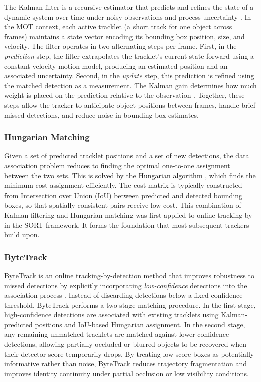 The Kalman filter is a recursive estimator that predicts and refines the 
state of a dynamic system over time under noisy observations and process 
uncertainty \citep{Kalman1960}. In the MOT context, each active tracklet (a short track for one object across frames)
maintains a state vector encoding its bounding box position, size, and 
velocity. The filter operates in two alternating steps per frame. First, 
in the \emph{prediction} step, the filter extrapolates the tracklet's 
current state forward using a constant-velocity motion model, producing an 
estimated position and an associated uncertainty. Second, in the 
\emph{update} step, this prediction is refined using the matched detection 
as a measurement. The Kalman gain determines how much weight is placed on
the prediction relative to the observation \citep{WelchBishop2006}. 
Together, these steps allow the tracker to anticipate object positions 
between frames, handle brief missed detections, and reduce noise in 
bounding box estimates.

\subsubsection*{Hungarian Matching}

Given a set of predicted tracklet positions and a set of new detections, 
the data association problem reduces to finding the optimal one-to-one 
assignment between the two sets. This is solved by the Hungarian algorithm 
\citep{Kuhn1955, Munkres1957}, which finds the minimum-cost assignment 
efficiently. The cost matrix is typically constructed from Intersection 
over Union (IoU) between predicted and detected bounding boxes, so that 
spatially consistent pairs receive low cost. This combination of Kalman 
filtering and Hungarian matching was first applied to online tracking by 
\citet{Bewley2016} in the SORT framework. It forms the foundation that most subsequent trackers build upon.

\subsubsection*{ByteTrack}

ByteTrack is an online tracking-by-detection method that improves robustness 
to missed detections by explicitly incorporating \emph{low-confidence} 
detections into the association process \citep{Zhang2021ByteTrack}. Instead 
of discarding detections below a fixed confidence threshold, ByteTrack 
performs a two-stage matching procedure. In the first stage, high-confidence 
detections are associated with existing tracklets using Kalman-predicted 
positions and IoU-based Hungarian assignment. In the second stage, any 
remaining unmatched tracklets are matched against lower-confidence detections, 
allowing partially occluded or blurred objects to be recovered when their 
detector score temporarily drops. By treating low-score boxes as potentially 
informative rather than noise, ByteTrack reduces trajectory fragmentation 
and improves identity continuity under partial occlusion or low visibility 
conditions.

